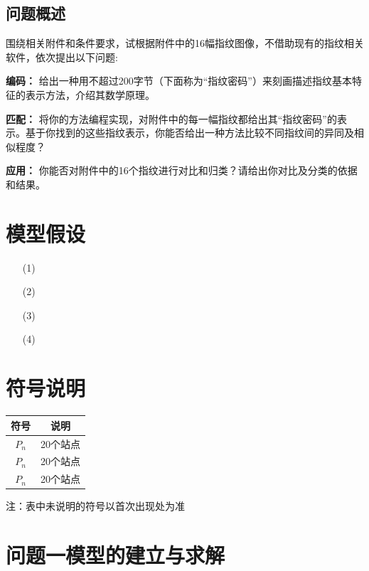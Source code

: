 \documentclass{whutmod}
\begin{document}
		\subsection{问题概述}
		    围绕相关附件和条件要求，试根据附件中的16幅指纹图像，不借助现有的指纹相关软件，依次提出以下问题:
				 
			\textbf{编码：} 给出一种用不超过200字节（下面称为“指纹密码”）来刻画描述指纹基本特征的表示方法，介绍其数学原理。
			
			\textbf{匹配：} 将你的方法编程实现，对附件中的每一幅指纹都给出其“指纹密码”的表示。基于你找到的这些指纹表示，你能否给出一种方法比较不同指纹间的异同及相似程度？
			
			\textbf{应用：} 你能否对附件中的16个指纹进行对比和归类？请给出你对比及分类的依据和结果。

	\section{模型假设}
		\begin{itemize}                                             
		\item [(1)] 
		\item [(2)]
		\item [(3)] 
		\item [(4)] 
		\end{itemize}

		
	\section{符号说明}
		\begin{table}[H]
		\centering
		\setlength{\tabcolsep}{12mm}
		\begin{tabular}{cc}
			\toprule[1.5pt]
			\multicolumn{1}{m{5cm}}{\centering 符号} & \multicolumn{1}{m{5cm}}{\centering 说明} \\
			\midrule[1pt]		
			$P_n$  & 20个站点  \\ 
			$P_n$  & 20个站点  \\ 
		   	$P_n$  & 20个站点  \\ 
			\bottomrule[1.5pt]
		\end{tabular}
		\begin{tablenotes}
		\item 注：表中未说明的符号以首次出现处为准
		\end{tablenotes}
		\end{table}

	\section{问题一模型的建立与求解}
\end{document}
